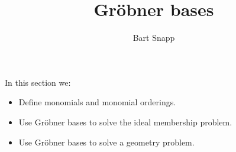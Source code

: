 \documentclass{ximera}
\author{Bart Snapp}
\title{Gr\"obner bases}
\begin{document}
\begin{abstract}
\end{abstract}
\maketitle
In this section we:

\begin{itemize}
\item Define monomials and monomial orderings.
\item Use Gr\"obner bases to solve the ideal membership problem.
\item Use Gr\"obner bases to solve a geometry problem.
\end{itemize}
\end{document}
